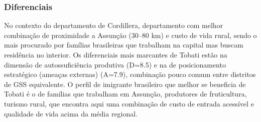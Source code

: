 \subsubsection*{Diferenciais}\label{dif-tobati-0318}
No contexto do departamento de Cordillera, departamento com melhor combinação de proximidade a Assunção (30–80 km) e custo de vida rural, sendo o mais procurado por famílias brasileiras que trabalham na capital mas buscam residência no interior. Os diferenciais mais marcantes de Tobati estão na dimensão de autossuficiência produtiva (D=8.5) e na de posicionamento estratégico (ameaças externas) (A=7.9), combinação pouco comum entre distritos de GSS equivalente. O perfil de imigrante brasileiro que melhor se beneficia de Tobati é o de famílias que trabalham em Assunção, produtores de fruticultura, turismo rural, que encontra aqui uma combinação de custo de entrada acessível e qualidade de vida acima da média regional.
